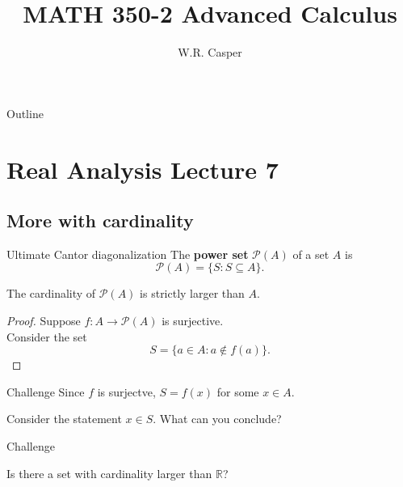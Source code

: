 \documentclass{beamer}
\title{MATH 350-2 Advanced Calculus}
\subtitle
{} %
\author[W.R. Casper] %
{W.R. Casper}
\institute[California State University Fullerton] %
{
  Department of Mathematics\\
  California State University Fullerton}
\begin{document}
\begin{frame}
  \titlepage
\end{frame}

\begin{frame}{Outline}
  \tableofcontents
\end{frame}



\section{Real Analysis Lecture 7}

\subsection{More with cardinality}

\begin{frame}{Ultimate Cantor diagonalization}
The \textbf{power set}  $\mathcal{P}(A)$ of a set $A$ is
$$\mathcal P(A) = \{S: S\subseteq A\}.$$
\pause
\begin{thm}
The cardinality of $\mathcal P(A)$ is strictly larger than $A$.
\end{thm}
\pause
\begin{proof}
\pause
Suppose $f: A\rightarrow \mathcal P(A)$ is surjective.\\
\pause
Consider the set
$$S = \{a\in A: a\notin f(a)\}.$$
\end{proof}
\end{frame}

\begin{frame}{Challenge}
\pause
Since $f$ is surjectve, $S = f(x)$ for some $x\in A$.
\pause
\begin{prob}
Consider the statement $x\in S$.  What can you conclude?
\end{prob}
\end{frame}

\begin{frame}{Challenge}
\begin{prob}
Is there a set with cardinality larger than $\mathbb{R}$?
\end{prob}
\end{frame}
\end{document}
